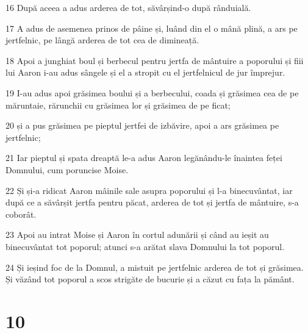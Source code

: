 \par 16 După aceea a adus arderea de tot, săvârșind-o după rânduială.
\par 17 A adus de asemenea prinos de pâine și, luând din el o mână plină, a ars pe jertfelnic, pe lângă arderea de tot cea de dimineață.
\par 18 Apoi a junghiat boul și berbecul pentru jertfa de mântuire a poporului și fiii lui Aaron i-au adus sângele și el a stropit cu el jertfelnicul de jur împrejur.
\par 19 I-au adus apoi grăsimea boului și a berbecului, coada și grăsimea cea de pe măruntaie, rărunchii cu grăsimea lor și grăsimea de pe ficat;
\par 20 și a pus grăsimea pe pieptul jertfei de izbăvire, apoi a ars grăsimea pe jertfelnic;
\par 21 Iar pieptul și spata dreaptă le-a adus Aaron legănându-le înaintea feței Domnului, cum poruncise Moise.
\par 22 Și și-a ridicat Aaron mâinile sale asupra poporului și l-a binecuvântat, iar după ce a săvârșit jertfa pentru păcat, arderea de tot și jertfa de mântuire, s-a coborât.
\par 23 Apoi au intrat Moise și Aaron în cortul adunării și când au ieșit au binecuvântat tot poporul; atunci s-a arătat slava Domnului la tot poporul.
\par 24 Și ieșind foc de la Domnul, a mistuit pe jertfelnic arderea de tot și grăsimea. Și văzând tot poporul a scos strigăte de bucurie și a căzut cu fața la pământ.

\chapter{10}

